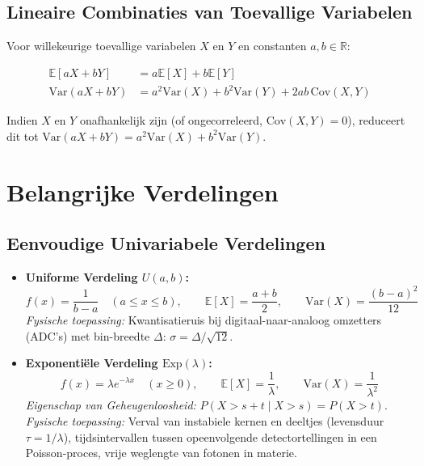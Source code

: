 \documentclass[11pt,a4paper]{article}
\newcommand{\E}{\mathbb{E}}
\newcommand{\Var}{\text{Var}}
\newcommand{\Cov}{\text{Cov}}
\begin{document}
\subsection{Lineaire Combinaties van Toevallige Variabelen}
Voor willekeurige toevallige variabelen $X$ en $Y$ en constanten $a, b \in \mathbb{R}$:
\begin{formulabox}
\begin{align}
    \E[aX + bY] &= a\E[X] + b\E[Y] \\
    \Var(aX + bY) &= a^2 \Var(X) + b^2 \Var(Y) + 2ab \, \Cov(X, Y)
\end{align}
\end{formulabox}
Indien $X$ en $Y$ onafhankelijk zijn (of ongecorreleerd, $\Cov(X, Y) = 0$), reduceert dit tot $\Var(aX + bY) = a^2 \Var(X) + b^2 \Var(Y)$.


\section{Belangrijke Verdelingen}

\subsection{Eenvoudige Univariabele Verdelingen}
\begin{itemize}[leftmargin=1.5em]
    \item \textbf{Uniforme Verdeling $U(a, b)$:}
    \begin{equation}
        f(x) = \frac{1}{b - a} \quad (a \le x \le b), \qquad \E[X] = \frac{a + b}{2}, \qquad \Var(X) = \frac{(b - a)^2}{12}
    \end{equation}
    \emph{Fysische toepassing:} Kwantisatieruis bij digitaal-naar-analoog omzetters (ADC's) met bin-breedte $\Delta$: $\sigma = \Delta / \sqrt{12}$.
    \item \textbf{Exponentiële Verdeling $\text{Exp}(\lambda)$:}
    \begin{equation}
        f(x) = \lambda e^{-\lambda x} \quad (x \ge 0), \qquad \E[X] = \frac{1}{\lambda}, \qquad \Var(X) = \frac{1}{\lambda^2}
    \end{equation}
    \emph{Eigenschap van Geheugenloosheid:} $P(X > s + t \mid X > s) = P(X > t)$.
    \emph{Fysische toepassing:} Verval van instabiele kernen en deeltjes (levensduur $\tau = 1/\lambda$), tijdsintervallen tussen opeenvolgende detectortellingen in een Poisson-proces, vrije weglengte van fotonen in materie.
\end{itemize}
\end{document}
